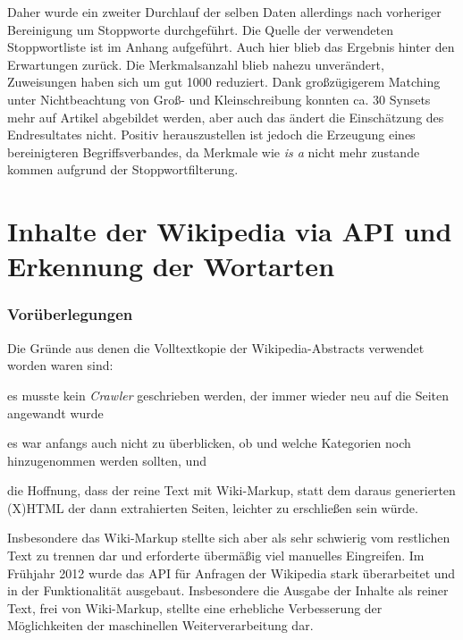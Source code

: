 \documentclass[pagesize,paper=A4,DIV=calc,fontsize=12pt,draft=false]{scrreprt}
\begin{document}
Daher wurde ein zweiter Durchlauf der selben Daten allerdings nach vorheriger Bereinigung um Stoppworte durchgeführt. 
Die Quelle der verwendeten Stoppwortliste ist im Anhang aufgeführt. 
Auch hier blieb das Ergebnis hinter den Erwartungen zurück. 
Die Merkmalsanzahl blieb nahezu unverändert, Zuweisungen haben sich um gut 1000 reduziert. 
Dank großzügigerem Matching unter Nichtbeachtung von Groß- und Kleinschreibung konnten ca. 30 Synsets mehr auf Artikel abgebildet werden, aber auch das ändert die Einschätzung des Endresultates nicht. 
Positiv herauszustellen ist jedoch die Erzeugung eines bereinigteren Begriffsverbandes, da Merkmale wie \emph{is a} nicht mehr zustande kommen aufgrund der Stoppwortfilterung. 

\section{Inhalte der Wikipedia via API und Erkennung der Wortarten}

\subsubsection{Vorüberlegungen}

Die Gründe aus denen die Volltextkopie der Wikipedia-Abstracts verwendet worden waren sind: 
\begin{inparaenum}
\item es musste kein \emph{Crawler} geschrieben werden, der immer wieder neu auf die Seiten angewandt wurde
\item es war anfangs auch nicht zu überblicken, ob und welche Kategorien noch hinzugenommen werden sollten, und 
\item die Hoffnung, dass der reine Text mit Wiki-Markup, statt dem daraus generierten (X)HTML der dann extrahierten Seiten, leichter zu erschließen sein würde.
\end{inparaenum}

Insbesondere das Wiki-Markup stellte sich aber als sehr schwierig vom restlichen Text zu trennen dar und erforderte übermäßig viel manuelles Eingreifen. 
Im Frühjahr 2012 wurde das API für Anfragen der Wikipedia stark überarbeitet und in der Funktionalität ausgebaut. 
Insbesondere die Ausgabe der Inhalte als reiner Text, frei von Wiki-Markup, stellte eine erhebliche Verbesserung der Möglichkeiten der maschinellen Weiterverarbeitung dar. 
\end{document}
